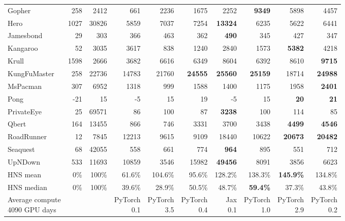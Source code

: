 \begin{table}[h]
{\begin{tabular}{lrr|rrrrrrr}
    Gopher & 258 & 2412 & 661 & 2236 & 1675 & 2252 & \textbf{9349} & 5898 & 4457\\
    Hero & 1027 & 30826 & 5859 & 7037 & 7254 & \textbf{13324} & 6235 & 5622 & 6441\\
    Jamesbond & 29 & 303 & 366 & 463 & 362 & \textbf{490} & 345 & 427 & 347\\
    Kangaroo & 52 & 3035 & 3617 & 838 & 1240 & 2840 & 1573 & \textbf{5382} & 4218\\
    Krull & 1598 & 2666 & 3682 & 6616 & 6349 & 8604 & 6392 & 8610 & \textbf{9715}\\
    KungFuMaster & 258 & 22736 & 14783 & 21760 & \textbf{24555} & \textbf{25560} & \textbf{25159} & 18714 & \textbf{24988}\\
    MsPacman & 307 & 6952 & 1318 & 999 & 1588 & 1400 & 1175 & 1958 & \textbf{2401}\\
    Pong & -21 & 15 & -5 & 15 & 19 & -5 & 15 & \textbf{20} & \textbf{21}\\
    PrivateEye & 25 & 69571 & 86 & 100 & 87 & \textbf{3238} & 100 & 114 & 85\\
    Qbert & 164 & 13455 & 866 & 746 & 3331 & 3700 & 3438 & \textbf{4499} & \textbf{4546}\\
    RoadRunner & 12 & 7845 & 12213 & 9615 & 9109 & 18440 & 10622 & \textbf{20673} & \textbf{20482}\\
    Seaquest & 68 & 42055 & 558 & 661 & 774 & \textbf{964} & 895 & 551 & 712\\
    UpNDown & 533 & 11693 & 10859 & 3546 & 15982 & \textbf{49456} & 8091 & 3856 & 6623\\
    \midrule
    HNS mean & 0\% & 100\%  & 61.6\% & 104.6\% & 95.6\% & 128.2\% & 138.3\% & \textbf{145.9\%} & 134.8\% \\ 
    HNS median & 0\% & 100\%  & 39.6\% & 28.9\% & 50.5\% & 48.7\% & \textbf{59.4\%} & 37.3\% & 43.8\% \\
    \midrule
    \makecell[bl]{Average compute\\4090 GPU days} & & & \makecell[br]{PyTorch\\0.1} & \makecell[br]{PyTorch\\3.5} & \makecell[br]{PyTorch\\0.4} & \makecell[br]{Jax\\0.1} & \makecell[br]{PyTorch\\1.0} & \makecell[br]{PyTorch\\2.9} & \makecell[br]{PyTorch\\0.2}\\
    \bottomrule
    \end{tabular}}
\end{table}

